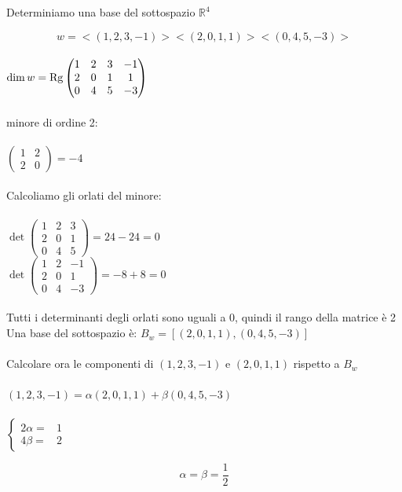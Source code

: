 \begin{esercizio}
  Determiniamo una base del sottospazio $\mathbb{R}^4$

  $$w=<(1,2,3,-1)><(2,0,1,1)><(0,4,5,-3)>$$
  \leavevmode\\
  $\dim w=\textnormal{Rg}
  \begin{pmatrix}
    1 & 2 & 3 & -1\\
    2 & 0 & 1 &  1\\
    0 & 4 & 5 & -3\\
  \end{pmatrix}$
  \leavevmode\\\\
  minore di ordine 2:
  \leavevmode\\\\
  $
  \begin{pmatrix}
    1 & 2\\
    2 & 0
  \end{pmatrix}=-4
  $
  \leavevmode\\\\
  Calcoliamo gli orlati del minore:
  \leavevmode\\\\
  $
  \det
  \begin{pmatrix}
    1 & 2 & 3\\
    2 & 0 & 1\\
    0 & 4 & 5
  \end{pmatrix}=24-24=0
  $
  \leavevmode\\
  $
  \det
  \begin{pmatrix}
    1 & 2 & -1\\
    2 & 0 &  1\\
    0 & 4 & -3
  \end{pmatrix}=-8+8=0
  $
  \leavevmode\\\\
  Tutti i determinanti degli orlati sono uguali a 0, quindi il rango
  della matrice è 2
  \leavevmode\\
  Una base del sottospazio è: $B_w=[(2,0,1,1),(0,4,5,-3)]$
  \leavevmode\\\\
  Calcolare ora le componenti di $(1,2,3,-1)$ e $(2,0,1,1)$ rispetto a $B_w$
  \leavevmode\\\\
  $(1,2,3,-1)=\alpha(2,0,1,1)+\beta(0,4,5,-3)$
  \leavevmode\\\\
  $
  \begin{cases}
    2\alpha=  &  \text{1} \\
    4\beta=  &  \text{2}
  \end{cases}$

  $$\alpha=\beta=\frac{1}{2}$$
\end{esercizio}

